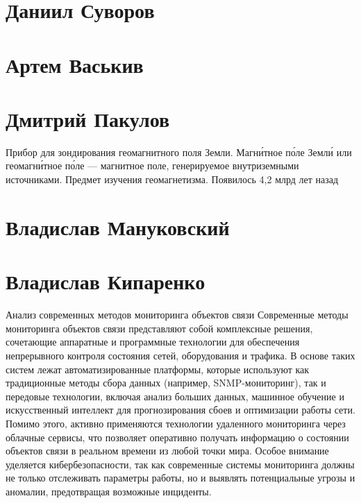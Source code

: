 \documentclass{article}
\begin{document}
\section*{Даниил Суворов}

\section*{Артем Васькив}

\section*{Дмитрий Пакулов}
Прибор для зондирования геомагнитного поля Земли. Магни́тное по́ле Земли́ или геомагни́тное по́ле — магнитное поле, генерируемое внутриземными источниками. Предмет изучения геомагнетизма. Появилось 4,2 млрд лет назад

\section*{Владислав Мануковский}
\section*{Владислав Кипаренко}
Анализ современных методов мониторинга объектов связи
Современные методы мониторинга объектов связи представляют собой комплексные решения, сочетающие аппаратные и программные технологии для обеспечения непрерывного контроля состояния сетей, оборудования и трафика. В основе таких систем лежат автоматизированные платформы, которые используют как традиционные методы сбора данных (например, SNMP-мониторинг), так и передовые технологии, включая анализ больших данных, машинное обучение и искусственный интеллект для прогнозирования сбоев и оптимизации работы сети. Помимо этого, активно применяются технологии удаленного мониторинга через облачные сервисы, что позволяет оперативно получать информацию о состоянии объектов связи в реальном времени из любой точки мира. Особое внимание уделяется кибербезопасности, так как современные системы мониторинга должны не только отслеживать параметры работы, но и выявлять потенциальные угрозы и аномалии, предотвращая возможные инциденты.
\end{document}
